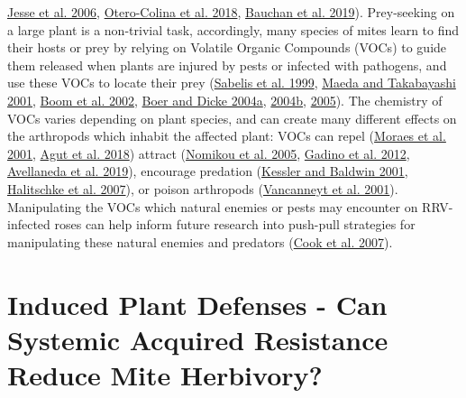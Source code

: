 \documentclass{ufdissertation}[overrideChapters] %
\begin{document}
{\protect\hyperlink{ref-Jesse2006}{Jesse et al. 2006}, \protect\hyperlink{ref-Otero-Colina2018}{Otero-Colina et al. 2018}, \protect\hyperlink{ref-Bauchan2019}{Bauchan et al. 2019}). Prey-seeking on a large plant is a non-trivial task, accordingly, many species of mites learn to find their hosts or prey by relying on Volatile Organic Compounds (VOCs) to guide them released when plants are injured by pests or infected with pathogens, and use these VOCs to locate their prey (\protect\hyperlink{ref-Sabelis1999}{Sabelis et al. 1999}, \protect\hyperlink{ref-Maeda2001}{Maeda and Takabayashi 2001}, \protect\hyperlink{ref-Boom2002}{Boom et al. 2002}, \protect\hyperlink{ref-Boer2004a}{Boer and Dicke 2004a}, \protect\hyperlink{ref-Boer2004b}{2004b}, \protect\hyperlink{ref-Boer2005}{2005}). The chemistry of VOCs varies depending on plant species, and can create many different effects on the arthropods which inhabit the affected plant: VOCs can repel (\protect\hyperlink{ref-Moraes2001}{Moraes et al. 2001}, \protect\hyperlink{ref-Agut2018}{Agut et al. 2018}) attract (\protect\hyperlink{ref-Nomikou2005}{Nomikou et al. 2005}, \protect\hyperlink{ref-Gadino2012}{Gadino et al. 2012}, \protect\hyperlink{ref-Avellaneda2019}{Avellaneda et al. 2019}), encourage predation (\protect\hyperlink{ref-Kessler2001}{Kessler and Baldwin 2001}, \protect\hyperlink{ref-Halitschke2007}{Halitschke et al. 2007}), or poison arthropods (\protect\hyperlink{ref-Vancanneyt2001}{Vancanneyt et al. 2001}). Manipulating the VOCs which natural enemies or pests may encounter on RRV-infected roses can help inform future research into push-pull strategies for manipulating these natural enemies and predators (\protect\hyperlink{ref-Cook2007}{Cook et al. 2007}).

\hypertarget{chemeco}{%
\section{Induced Plant Defenses - Can Systemic Acquired Resistance Reduce Mite Herbivory?}\label{chemeco}}

}
\end{document}
